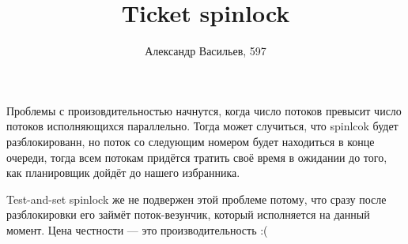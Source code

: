 \documentclass[a4paper]{paper}
\title{Ticket spinlock}
\author{Александр Васильев, 597}
\begin{document}
 
\maketitle

Проблемы с произовдительностью начнутся, когда число потоков превысит
число потоков исполняющихся параллельно. Тогда может случиться, что spinlcok
будет разблокированн, но поток со следующим номером будет находиться в
конце очереди, тогда всем потокам придётся тратить своё время в ожидании до
того, как планировщик дойдёт до нашего избранника.

Test-and-set spinlock же не подвержен этой проблеме потому, что сразу после
разблокировки его займёт поток-везунчик, который исполняется на данный момент.
Цена честности --- это производительность :(
\end{document}
